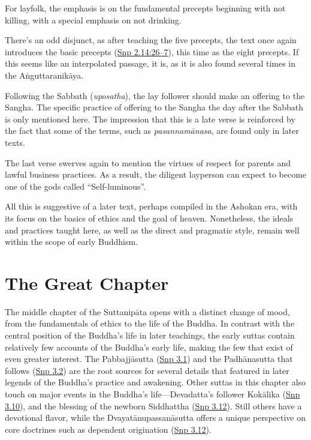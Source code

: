 \documentclass[12pt,openany]{book}%
\begin{document}
For layfolk, the emphasis is on the fundamental precepts beginning with not killing, with a special emphasis on not drinking.

There’s an odd disjunct, as after teaching the five precepts, the text once again introduces the basic precepts (\href{https://suttacentral.net/snp2.14/en/sujato\#26}{Snp 2.14:26–7}), this time as the eight precepts. If this seems like an interpolated passage, it is, as it is also found several times in the \textsanskrit{Aṅguttaranikāya}.

Following the Sabbath (\textit{uposatha}), the lay follower should make an offering to the Sangha. The specific practice of offering to the Sangha the day after the Sabbath is only mentioned here. The impression that this is a late verse is reinforced by the fact that some of the terms, such as \textit{\textsanskrit{pasannamānasa}}, are found only in later texts.

The last verse swerves again to mention the virtues of respect for parents and lawful business practices. As a result, the diligent layperson can expect to become one of the gods called “Self-luminous”.

All this is suggestive of a later text, perhaps compiled in the Ashokan era, with its focus on the basics of ethics and the goal of heaven. Nonetheless, the ideals and practices taught here, as well as the direct and pragmatic style, remain well within the scope of early Buddhism.

\section*{The Great Chapter}

The middle chapter of the \textsanskrit{Suttanipāta} opens with a distinct change of mood, from the fundamentals of ethics to the life of the Buddha. In contrast with the central position of the Buddha’s life in later teachings, the early suttas contain relatively few accounts of the Buddha’s early life, making the few that exist of even greater interest. The \textsanskrit{Pabbajjāsutta} (\href{https://suttacentral.net/snp3.1/en/sujato}{Snp 3.1}) and the \textsanskrit{Padhānasutta} that follows (\href{https://suttacentral.net/snp3.2/en/sujato}{Snp 3.2}) are the root sources for several details that featured in later legends of the Buddha’s practice and awakening. Other suttas in this chapter also touch on major events in the Buddha’s life—Devadatta’s follower \textsanskrit{Kokālika} (\href{https://suttacentral.net/snp3.10/en/sujato}{Snp 3.10}), and the blessing of the newborn Siddhattha (\href{https://suttacentral.net/snp3.12/en/sujato}{Snp 3.12}). Still others have a devotional flavor, while the \textsanskrit{Dvayatānupassanāsutta} offers a unique perspective on core doctrines such as dependent origination (\href{https://suttacentral.net/snp3.12/en/sujato}{Snp 3.12}).
\end{document}
